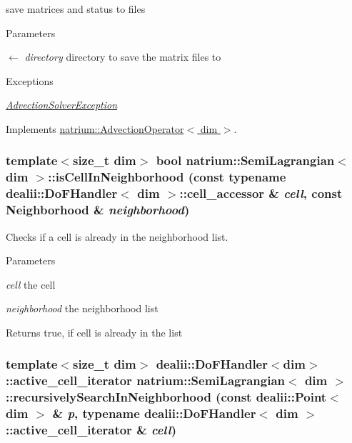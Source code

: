 save matrices and status to files 
\begin{DoxyParams}{Parameters}
\item[\mbox{$\leftarrow$} {\em directory}]directory to save the matrix files to \end{DoxyParams}

\begin{DoxyExceptions}{Exceptions}
\item[{\em \hyperlink{classnatrium_1_1AdvectionSolverException}{AdvectionSolverException}}]\end{DoxyExceptions}


Implements \hyperlink{classnatrium_1_1AdvectionOperator_a251e21d1dd023926d4c5f7fd973b90bf}{natrium::AdvectionOperator$<$ dim $>$}.\hypertarget{classnatrium_1_1SemiLagrangian_a1e41b66518f92c75135b2873a39160ff}{
\subsubsection[{isCellInNeighborhood}]{\setlength{\rightskip}{0pt plus 5cm}template$<$size\_\-t dim$>$ bool {\bf natrium::SemiLagrangian}$<$ dim $>$::isCellInNeighborhood (const typename dealii::DoFHandler$<$ dim $>$::cell\_\-accessor \& {\em cell}, \/  const {\bf Neighborhood} \& {\em neighborhood})}}
\label{classnatrium_1_1SemiLagrangian_a1e41b66518f92c75135b2873a39160ff}


Checks if a cell is already in the neighborhood list. 
\begin{DoxyParams}{Parameters}
\item[{\em cell}]the cell \item[{\em neighborhood}]the neighborhood list \end{DoxyParams}
\begin{DoxyReturn}{Returns}
true, if cell is already in the list 
\end{DoxyReturn}
\hypertarget{classnatrium_1_1SemiLagrangian_a9db13229770025b4c0461d8e4ff4ee50}{
\subsubsection[{recursivelySearchInNeighborhood}]{\setlength{\rightskip}{0pt plus 5cm}template$<$size\_\-t dim$>$ dealii::DoFHandler$<$dim$>$::active\_\-cell\_\-iterator {\bf natrium::SemiLagrangian}$<$ dim $>$::recursivelySearchInNeighborhood (const dealii::Point$<$ dim $>$ \& {\em p}, \/  typename dealii::DoFHandler$<$ dim $>$::active\_\-cell\_\-iterator \& {\em cell})}}
\label{classnatrium_1_1SemiLagrangian_a9db13229770025b4c0461d8e4ff4ee50}


